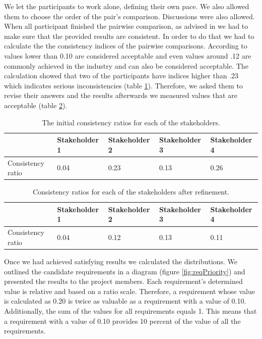 We let the participants to work alone, defining their own pace. We also allowed them to choose the order of the pair's comparison. Discussions were also allowed. When all participant finished the pairwise comparison, as advised in \cite{Karlsson} we had to make sure that the provided results are consistent. In order to do that we had to calculate the the consistency indices of the pairwise comparisons. According to \cite{Karlsson} values lower than 0.10 are considered acceptable and even values around .12 are commonly achieved in the industry and can also be considered acceptable. The calculation showed that two of the participants have indices higher than .23 which indicates serious inconsistencies (table \ref{tbl:reqInitialConsist}). Therefore, we asked them to revise their answers and the results afterwards we measured values that are acceptable (table \ref{tbl:reqFinalConsist}).
 
 \begin{table}[h!]
  \begin{center}
    \begin{tabular}{| l | l | l | l | l |}
    \hline
    & Stakeholder 1 & Stakeholder 2 & Stakeholder 3 & Stakeholder 4 \\	 \hline
    Consistency ratio & 0.04 & 0.23 & 0.13 & 0.26 \\
    \hline
    \end{tabular}
  \end{center}
  \caption{The initial consistency ratios for each of the stakeholders.}
  \label{tbl:reqInitialConsist}
\end{table}


 \begin{table}[h!]
  \begin{center}
    \begin{tabular}{| l | l | l | l | l |}
    \hline
    & Stakeholder 1 & Stakeholder 2 & Stakeholder 3 & Stakeholder 4 \\	 \hline
    Consistency ratio & 0.04 & 0.12 & 0.13 & 0.11 \\
    \hline
    \end{tabular}
  \end{center}
  \caption{Consistency ratios for each of the stakeholders after refinement.}
  \label{tbl:reqFinalConsist}
\end{table}

Once we had achieved satisfying results we calculated the distributions. We outlined the candidate requirements in a diagram (figure \ref{fig:reqPriority}) and presented the results to the project members. Each requirement's determined value is relative and based on a ratio scale. Therefore, a requirement whose value is calculated as 0.20 is twice as valuable as a requirement with a value of 0.10. Additionally, the sum of the values for all requirements equals 1. This means that a requirement with a value of 0.10 provides 10 percent of the value of all the requirements.

